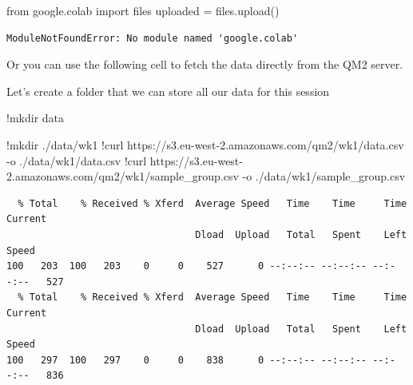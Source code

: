 \documentclass[
  letterpaper,
  DIV=11,
  numbers=noendperiod]{scrreprt}
\newenvironment{Shaded}{\begin{snugshade}}{\end{snugshade}}
\newcommand{\ErrorTok}[1]{\textcolor[rgb]{0.68,0.00,0.00}{#1}}
\newcommand{\FloatTok}[1]{\textcolor[rgb]{0.68,0.00,0.00}{#1}}
\newcommand{\ImportTok}[1]{\textcolor[rgb]{0.00,0.46,0.62}{#1}}
\newcommand{\NormalTok}[1]{\textcolor[rgb]{0.00,0.23,0.31}{#1}}
\newcommand{\OperatorTok}[1]{\textcolor[rgb]{0.37,0.37,0.37}{#1}}
\begin{document}
\begin{Shaded}
\begin{Highlighting}[]
\ImportTok{from}\NormalTok{ google.colab }\ImportTok{import}\NormalTok{ files}
\NormalTok{uploaded }\OperatorTok{=}\NormalTok{ files.upload()}
\end{Highlighting}
\end{Shaded}

\begin{verbatim}
ModuleNotFoundError: No module named 'google.colab'
\end{verbatim}

Or you can use the following cell to fetch the data directly from the
QM2 server.

Let's create a folder that we can store all our data for this session

\begin{Shaded}
\begin{Highlighting}[]
\OperatorTok{!}\NormalTok{mkdir data}
\end{Highlighting}
\end{Shaded}

\begin{Shaded}
\begin{Highlighting}[]
\OperatorTok{!}\NormalTok{mkdir .}\OperatorTok{/}\NormalTok{data}\OperatorTok{/}\NormalTok{wk1}
\OperatorTok{!}\NormalTok{curl https:}\OperatorTok{//}\NormalTok{s3.eu}\OperatorTok{{-}}\NormalTok{west}\OperatorTok{{-}}\FloatTok{2.}\ErrorTok{amazonaws}\NormalTok{.com}\OperatorTok{/}\NormalTok{qm2}\OperatorTok{/}\NormalTok{wk1}\OperatorTok{/}\NormalTok{data.csv }\OperatorTok{{-}}\NormalTok{o .}\OperatorTok{/}\NormalTok{data}\OperatorTok{/}\NormalTok{wk1}\OperatorTok{/}\NormalTok{data.csv}
\OperatorTok{!}\NormalTok{curl https:}\OperatorTok{//}\NormalTok{s3.eu}\OperatorTok{{-}}\NormalTok{west}\OperatorTok{{-}}\FloatTok{2.}\ErrorTok{amazonaws}\NormalTok{.com}\OperatorTok{/}\NormalTok{qm2}\OperatorTok{/}\NormalTok{wk1}\OperatorTok{/}\NormalTok{sample\_group.csv }\OperatorTok{{-}}\NormalTok{o .}\OperatorTok{/}\NormalTok{data}\OperatorTok{/}\NormalTok{wk1}\OperatorTok{/}\NormalTok{sample\_group.csv}
\end{Highlighting}
\end{Shaded}

\begin{verbatim}
  % Total    % Received % Xferd  Average Speed   Time    Time     Time  Current
                                 Dload  Upload   Total   Spent    Left  Speed
100   203  100   203    0     0    527      0 --:--:-- --:--:-- --:--:--   527
  % Total    % Received % Xferd  Average Speed   Time    Time     Time  Current
                                 Dload  Upload   Total   Spent    Left  Speed
100   297  100   297    0     0    838      0 --:--:-- --:--:-- --:--:--   836
\end{verbatim}
\end{document}
